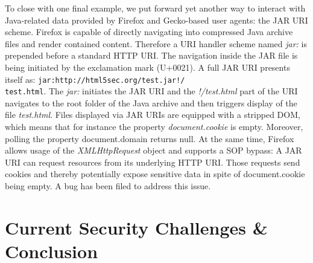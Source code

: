       To close with one final example, we put forward yet another way to interact with Java-related data provided by Firefox and Gecko-based user agents: the JAR URI scheme. Firefox is capable of directly navigating into compressed Java archive files and render contained content. Therefore a URI handler scheme named \textit{jar:} is prepended before a standard HTTP URI. The navigation inside the JAR file is being initiated by the exclamation mark (U+0021). A full JAR URI presents itself as: \texttt{jar:http://html5sec.org/test.jar!/\\
test.html}. The \textit{jar:} initiates the JAR URI and the \textit{!/test.html} part of the URI navigates to the root folder of the Java archive and then triggers display of the file \textit{test.html}. Files displayed via JAR URIs are equipped with a stripped DOM, which means that for instance the property \textit{document.cookie} is empty. Moreover, polling the property document.domain returns null. At the same time, Firefox allows usage of the \textit{XMLHttpRequest} object and supports a SOP bypass: A JAR URI can request resources from its underlying HTTP URI. Those requests send cookies and thereby potentially expose sensitive data in spite of document.cookie being empty. A bug has been filed to address this issue.




  \section{Current Security Challenges \& Conclusion}
  \label{subsec:2.5.current_security_challenges_conclusion}


